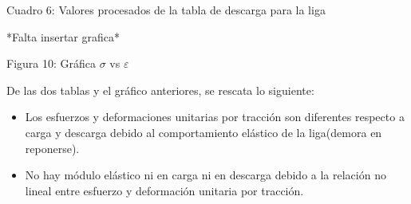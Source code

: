 Cuadro 6: Valores procesados de la tabla de descarga para la liga


*Falta insertar grafica*

Figura 10: Gráfica $\sigma$ vs $\varepsilon$

De las dos tablas y el gráfico anteriores, se rescata lo siguiente:

\begin{itemize}
  \item Los esfuerzos y deformaciones unitarias por tracción son diferentes respecto a carga y descarga debido al comportamiento elástico de la liga(demora en reponerse).
  \item No hay módulo elástico ni en carga ni en descarga debido a la relación no lineal entre esfuerzo y deformación unitaria por tracción.
\end{itemize}

